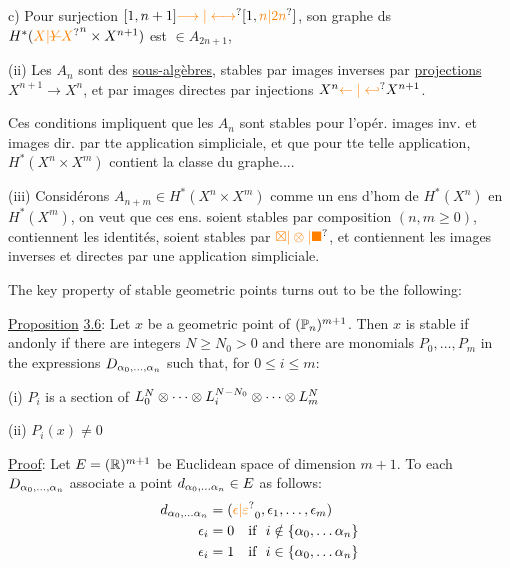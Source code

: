 c) Pour   surjection $[1,n+1]\unsure{\longrightarrow|\longleftrightarrow}[1,\unsure{n|2n}]$, son graphe ds $H^*(\unsure{X|\deleted{Y}X}^n\times X^{n+1})$ est $\in A_{2n+1}$, 

(ii) Les  $A_n$ sont des \uline{sous-algèbres}, stables par images inverses  par \uline{projections} $X^{n+1}\longrightarrow X^n$, et  par images directes par injections $X^n\unsure{\leftarrow|\hookleftarrow}X^{n+1}$.

Ces conditions impliquent que les $A_n$ sont stables pour l'opér. images inv. et images dir. par tte application simpliciale,  et que  pour tte telle application, $H^*(X^n\times X^m)$ contient la classe du graphe....

(iii) Considérons $A_{n+m}\in H^*(X^n\times X^m)$ comme un ens d'hom de $H^*(X^n)$ en $H^*(X^m)$, on veut que ces ens. soient stables par composition $(n,m\geq0)$, contiennent les identités, soient stables par $\unsure{\boxtimes|\otimes|\blacksquare}$, et contiennent les  images inverses et directes par une application simpliciale.


The key property of stable geometric points turns out to be the following:

\uline{Proposition} \uline{3.6}: Let $x$ be a geometric point of $(\mathbb P_n)^{m+1}$. Then $x$ is stable if andonly if there are integers $N\geq N_0>0$ and there are monomials $P_0,\ldots,P_m$ in the expressions $D_{\alpha_0,\ldots,\alpha_n}$ such that, for $0\leq i\leq m$:

(i) $P_i$ is a section of $L_0^N\otimes\cdots\otimes L_i^{N-N_0}\otimes\cdots\otimes L_m^N$

(ii) $P_i(x)\ne0$

\uline{Proof}: Let $E=(\mathbb R)^{m+1}$ be Euclidean space of dimension $m+1$. To each $D_{\alpha_0,\ldots,\alpha_n}$ associate a point $d_{\alpha_0,\ldots\alpha_n}\in E$ as follows:
\[
\begin{aligned}
d_{\handwritten{\alpha_0},\ldots\handwritten{\alpha_n}}&=(\unsure{\epsilon|\varepsilon}_0,\epsilon_1,\ldots,\epsilon_m)\\
\epsilon_i&=0\quad\text{if }\ i\handwritten{\notin\{}\handwritten{\alpha_0},\ldots\handwritten{\alpha_n}\handwritten{\}}\\
\epsilon_i&=1\quad\text{if }\ i\handwritten{\in\{}\handwritten{\alpha_0},\ldots\handwritten{\alpha_n}\handwritten{\}}
\end{aligned}
\]

